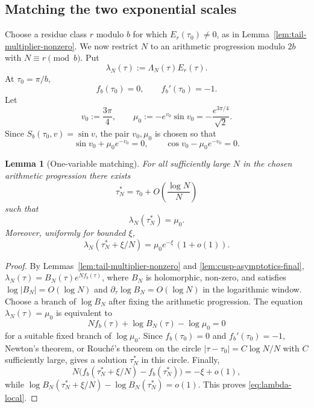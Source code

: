 \documentclass[11pt,a4paper,reqno]{amsart}
\newtheorem{lemma}[theorem]{Lemma}
\theoremstyle{remark}
\begin{document}
\subsection{Matching the two exponential scales}
Choose a residue class $r$ modulo $b$ for which $E_r(\tau_0)\ne0$, as in Lemma~\ref{lem:tail-multiplier-nonzero}.  We now restrict $N$ to an arithmetic progression modulo $2b$ with $N\equiv r\pmod b$.  Put
\[
        \lambda_N(\tau):=\Lambda_N(\tau)E_r(\tau).
\]
At $\tau_0=\pi/b$,
\[
        f_b(\tau_0)=0,
        \qquad
        f_b'(\tau_0)=-1.
\]
Let
\[
        v_0:=\frac{3\pi}{4},
        \qquad
        \mu_0:=-e^{v_0}\sin v_0=-\frac{e^{3\pi/4}}{\sqrt2}.
\]
Since $S_b(\tau_0,v)=\sin v$, the pair $v_0,\mu_0$ is chosen so that
\[
        \sin v_0+\mu_0e^{-v_0}=0,
        \qquad
        \cos v_0-\mu_0e^{-v_0}=0.
\]

\begin{lemma}[One-variable matching]\label{lem:one-variable-matching}
For all sufficiently large $N$ in the chosen arithmetic progression there exists
\[
        \tau_N^*=\tau_0+O\left(\frac{\log N}{N}\right)
\]
such that
\begin{equation}\label{eq:lambda-match}
        \lambda_N(\tau_N^*)=\mu_0.
\end{equation}
Moreover, uniformly for bounded $\xi$,
\begin{equation}\label{eq:lambda-local}
        \lambda_N(\tau_N^*+\xi/N)=\mu_0e^{-\xi}\,(1+o(1)).
\end{equation}
\end{lemma}

\begin{proof}
By Lemmas~\ref{lem:tail-multiplier-nonzero} and \ref{lem:cusp-asymptotics-final}, $\lambda_N(\tau)=B_N(\tau)e^{Nf_b(\tau)}$, where $B_N$ is holomorphic, non-zero, and satisfies $\log|B_N|=O(\log N)$ and $\partial_\tau\log B_N=O(\log N)$ in the logarithmic window.  Choose a branch of $\log B_N$ after fixing the arithmetic progression.  The equation $\lambda_N(\tau)=\mu_0$ is equivalent to
\[
        Nf_b(\tau)+\log B_N(\tau)-\log\mu_0=0
\]
for a suitable fixed branch of $\log\mu_0$.  Since $f_b(\tau_0)=0$ and $f_b'(\tau_0)=-1$, Newton's theorem, or Rouch\'e's theorem on the circle $|\tau-\tau_0|=C\log N/N$ with $C$ sufficiently large, gives a solution $\tau_N^*$ in this circle.  Finally,
\[
        N\big(f_b(\tau_N^*+\xi/N)-f_b(\tau_N^*)\big)=-\xi+o(1),
\]
while $\log B_N(\tau_N^*+\xi/N)-\log B_N(\tau_N^*)=o(1)$.  This proves \eqref{eq:lambda-local}.
\end{proof}
\end{document}
